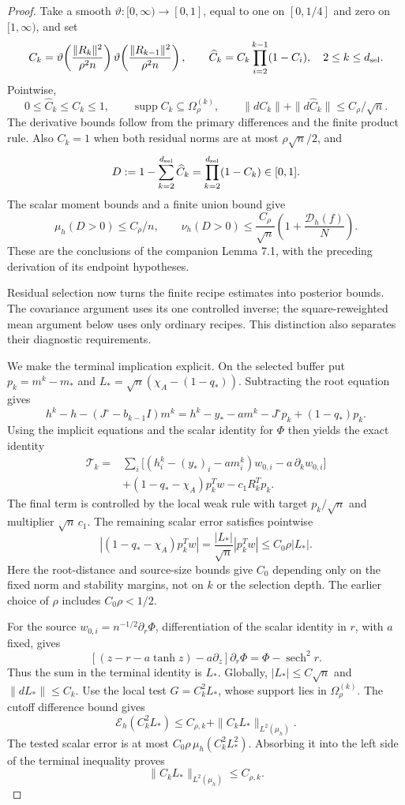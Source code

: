 \begin{proof}
Take a smooth \(\vartheta:[0,\infty)\to[0,1]\), equal to one
on \([0,1/4]\) and zero on \([1,\infty)\), and set
\[
 C_k=\vartheta\!\left(\frac{\|R_k\|^2}{\rho^2n}\right)
       \vartheta\!\left(\frac{\|R_{k-1}\|^2}{\rho^2n}\right),
 \qquad
 \widehat C_k=C_k\prod_{i=2}^{k-1}(1-C_i),
 \quad 2\le k\le d_{\rm sel}.
\]
Pointwise,
\[
 0\le\widehat C_k\le C_k\le1,\qquad
 \operatorname{supp}C_k\subseteq\Omega_\rho^{(k)},\qquad
 \|dC_k\|+\|d\widehat C_k\|\le C_\rho/\sqrt n.
\]
The derivative bounds follow from the primary differences and the
finite product rule. Also \(C_k=1\) when both residual norms are
at most \(\rho\sqrt n/2\), and
\[
 D:=1-\sum_{k=2}^{d_{\rm sel}}\widehat C_k
       =\prod_{k=2}^{d_{\rm sel}}(1-C_k)\in[0,1].
\]
The scalar moment bounds and a finite union bound give
\[
 \mu_h(D>0)\le C_\rho/n,
 \qquad
 \nu_h(D>0)\le\frac{C_\rho}{\sqrt n}
                      \left(1+\frac{\mathcal D_h(f)}N\right).
\]
These are the conclusions of the companion Lemma 7.1, with the
preceding derivation of its endpoint hypotheses.

Residual selection now turns the finite recipe estimates into posterior
bounds. The covariance argument uses its one controlled inverse; the
square-reweighted mean argument below uses only ordinary recipes.
This distinction also separates their diagnostic requirements.

We make the terminal implication explicit. On the selected buffer
put \(p_k=m^k-m_*\) and
\(L_*=\sqrt n(\chi_A-(1-q_*))\). Subtracting the root equation gives
\[
 h^k-h-(J^\circ-b_{k-1}I)m^k
 =h^k-y_*-a m^k-J^\circ p_k+(1-q_*)p_k.
\]
Using the implicit equations and the scalar identity for \(\Phi\)
then yields the exact identity
\[
\begin{split}
 \mathcal T_k={}&
 \sum_i\bigl[(h_i^k-(y_*)_i-a m_i^k)w_{0,i}
                         -a\,\partial_k w_{0,i}\bigr]\\
 &+(1-q_*-\chi_A)p_k^Tw-c_1R_k^Tp_k.
\end{split}
\]
The final term is controlled by the local weak rule with target
\(p_k/\sqrt n\) and multiplier \(\sqrt n\,c_1\). The remaining
scalar error satisfies pointwise
\[
 |(1-q_*-\chi_A)p_k^Tw|
 =\frac{|L_*|}{\sqrt n}|p_k^Tw|
 \le C_0\rho |L_*|.
\]
Here the root-distance and source-size bounds give \(C_0\)
depending only on the fixed norm and stability margins, not on
\(k\) or the selection depth. The earlier choice of \(\rho\)
includes \(C_0\rho<1/2\).

For the source \(w_{0,i}=n^{-1/2}\partial_r\Phi\), differentiation
of the scalar identity in \(r\), with \(a\) fixed, gives
\[
 [(z-r-a\tanh z)-a\partial_z]\partial_r\Phi
       =\Phi-\operatorname{sech}^2r.
\]
Thus the sum in the terminal identity is \(L_*\). Globally,
\(|L_*|\le C\sqrt n\) and \(\|dL_*\|\le C_k\).
Use the local test \(G=C_k^2L_*\), whose support lies in
\(\Omega_\rho^{(k)}\). The cutoff difference bound gives
\[
 \mathcal E_h(C_k^2L_*)\le C_{\rho,k}
                 +\|C_kL_*\|_{L^2(\mu_h)}.
\]
The tested scalar error is at most
\(C_0\rho\,\mu_h(C_k^2L_*^2)\). Absorbing it into the left side
of the terminal inequality proves
\[
 \|C_kL_*\|_{L^2(\mu_h)}\le C_{\rho,k}.
\]


\end{proof}
